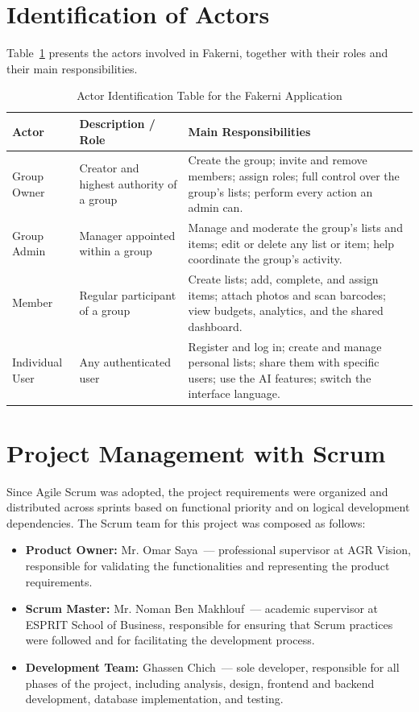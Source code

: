 \documentclass[12pt,a4paper,oneside]{report}
\newcommand{\mySchool}{ESPRIT School of Business}
\newcommand{\myAuthor}{Ghassen Chich}
\newcommand{\myCompany}{AGR Vision}
\newcommand{\myProSupervisor}{Mr. Omar Saya}
\newcommand{\myAcadSupervisor}{Mr. Noman Ben Makhlouf}
\begin{document}
\section{Identification of Actors}
Table~\ref{tab:actors} presents the actors involved in Fakerni, together with
their roles and their main responsibilities.

\begin{table}[H]\centering
\caption{Actor Identification Table for the Fakerni Application}
\label{tab:actors}
\renewcommand{\arraystretch}{1.3}
\begin{tabularx}{\textwidth}{|p{2.6cm}|p{3.4cm}|X|}
\hline
\textbf{Actor} & \textbf{Description / Role} & \textbf{Main Responsibilities} \\ \hline
Group Owner & Creator and highest authority of a group &
Create the group; invite and remove members; assign roles; full control over the
group's lists; perform every action an admin can. \\ \hline
Group Admin & Manager appointed within a group &
Manage and moderate the group's lists and items; edit or delete any list or item;
help coordinate the group's activity. \\ \hline
Member & Regular participant of a group &
Create lists; add, complete, and assign items; attach photos and scan barcodes;
view budgets, analytics, and the shared dashboard. \\ \hline
Individual User & Any authenticated user &
Register and log in; create and manage personal lists; share them with specific
users; use the AI features; switch the interface language. \\ \hline
\end{tabularx}
\renewcommand{\arraystretch}{1}
\end{table}

\section{Project Management with Scrum}
Since Agile Scrum was adopted, the project requirements were organized and
distributed across sprints based on functional priority and on logical
development dependencies. The Scrum team for this project was composed as follows:
\begin{itemize}[nosep]
  \item \textbf{Product Owner:} \myProSupervisor\ --- professional supervisor at
        \myCompany, responsible for validating the functionalities and
        representing the product requirements.
  \item \textbf{Scrum Master:} \myAcadSupervisor\ --- academic supervisor at
        \mySchool, responsible for ensuring that Scrum practices were followed and
        for facilitating the development process.
  \item \textbf{Development Team:} \myAuthor\ --- sole developer, responsible for
        all phases of the project, including analysis, design, frontend and
        backend development, database implementation, and testing.
\end{itemize}
\end{document}
